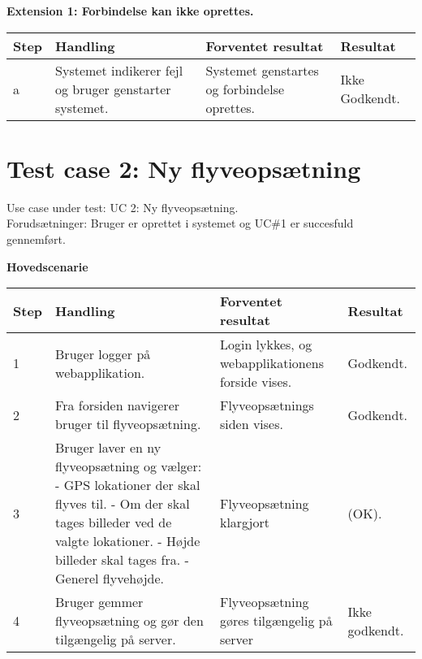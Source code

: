 \textbf{Extension 1: Forbindelse kan ikke oprettes.}
\begin{table}[H]
	\centering
		\begin{tabular}{|l|p{5 cm}|p{5 cm}|p{2.5 cm}|} 
		\hline
			\textbf{Step} & \textbf{Handling} & \textbf{Forventet resultat} & \textbf{Resultat} \\ \hline
			a & Systemet indikerer fejl og bruger genstarter systemet. & Systemet genstartes og \newline forbindelse oprettes. & Ikke Godkendt. \\ \hline
		\end{tabular}
\end{table}

\newpage
\section{Test case 2: Ny flyveopsætning}
Use case under test: UC 2: Ny flyveopsætning.\\
Forudsætninger:	Bruger er oprettet i systemet og UC\#1 er succesfuld gennemført.

\textbf{Hovedscenarie}
\begin{table}[H]
	\centering
		\begin{tabular}{|l|p{5 cm}|p{5 cm}|p{2.5 cm}|}
		\hline
			\textbf{Step} & \textbf{Handling} & \textbf{Forventet resultat} & \textbf{Resultat} \\ \hline
			1 & Bruger logger på \newline webapplikation. & Login lykkes, og webapplikationens forside vises. & Godkendt. \\ \hline
			2 & Fra forsiden navigerer bruger til flyveopsætning. & Flyveopsætnings siden vises. & Godkendt. \\ \hline
			3 & Bruger laver en ny \newline flyveopsætning og vælger: \newline
				- GPS lokationer der \newline skal flyves til. \newline
				- Om der skal tages billeder ved de valgte lokationer. \newline
				- Højde billeder skal tages fra. \newline
				- Generel flyvehøjde.				
				 & Flyveopsætning klargjort & (OK). \\ \hline
			4 & Bruger gemmer flyveopsætning og gør den tilgængelig på server. & Flyveopsætning gøres \newline tilgængelig på server & Ikke godkendt. \\ \hline
		\end{tabular}
\end{table}

